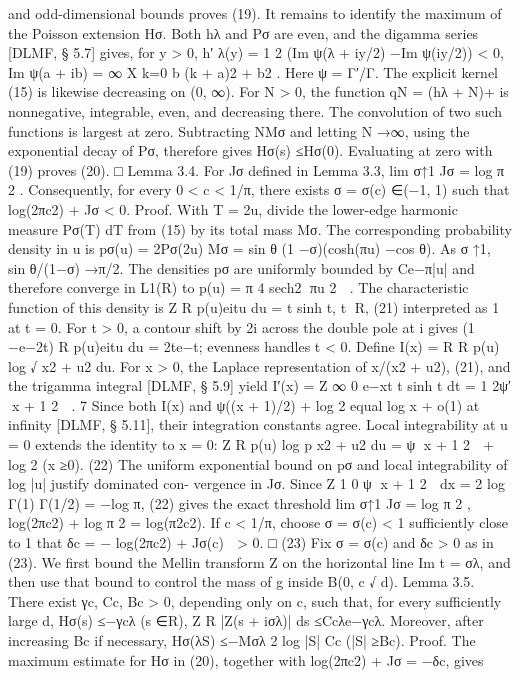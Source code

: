 and odd-dimensional bounds proves (19).
It remains to identify the maximum of the Poisson extension Hσ. Both hλ and Pσ are even,
and the digamma series [DLMF, § 5.7] gives, for y > 0,
h′
λ(y) = 1
2 (Im ψ(λ + iy/2) −Im ψ(iy/2)) < 0,
Im ψ(a + ib) =
∞
X
k=0
b
(k + a)2 + b2 .
Here ψ = Γ′/Γ. The explicit kernel (15) is likewise decreasing on (0, ∞). For N > 0, the function
qN = (hλ + N)+ is nonnegative, integrable, even, and decreasing there. The convolution of two
such functions is largest at zero. Subtracting NMσ and letting N →∞, using the exponential
decay of Pσ, therefore gives Hσ(s) ≤Hσ(0). Evaluating at zero with (19) proves (20).
□
Lemma 3.4. For Jσ deﬁned in Lemma 3.3,
lim
σ↑1 Jσ = log π
2 .
Consequently, for every 0 < c < 1/π, there exists σ = σ(c) ∈(−1, 1) such that log(2πc2) + Jσ <
0.
Proof. With T = 2u, divide the lower-edge harmonic measure Pσ(T) dT from (15) by its total
mass Mσ. The corresponding probability density in u is
pσ(u) = 2Pσ(2u)
Mσ
=
sin θ
(1 −σ)(cosh(πu) −cos θ).
As σ ↑1, sin θ/(1−σ) →π/2. The densities pσ are uniformly bounded by Ce−π|u| and therefore
converge in L1(R) to
p(u) = π
4 sech2
πu
2

.
The characteristic function of this density is
Z
R
p(u)eitu du =
t
sinh t,
t ∈R,
(21)
interpreted as 1 at t = 0. For t > 0, a contour shift by 2i across the double pole at i gives
(1 −e−2t)
R p(u)eitu du = 2te−t; evenness handles t < 0. Deﬁne I(x) =
R
R p(u) log
√
x2 + u2 du.
For x > 0, the Laplace representation of x/(x2 + u2), (21), and the trigamma integral [DLMF,
§ 5.9] yield
I′(x) =
Z ∞
0
e−xt
t
sinh t dt = 1
2ψ′
x + 1
2

.
7
Since both I(x) and ψ((x + 1)/2) + log 2 equal log x + o(1) at inﬁnity [DLMF, § 5.11], their
integration constants agree. Local integrability at u = 0 extends the identity to x = 0:
Z
R
p(u) log
p
x2 + u2 du = ψ
x + 1
2

+ log 2
(x ≥0).
(22)
The uniform exponential bound on pσ and local integrability of log |u| justify dominated con-
vergence in Jσ. Since
Z 1
0
ψ
x + 1
2

dx = 2 log Γ(1)
Γ(1/2) = −log π,
(22) gives the exact threshold
lim
σ↑1 Jσ = log π
2 ,
log(2πc2) + log π
2 = log(π2c2).
If c < 1/π, choose σ = σ(c) < 1 suﬃciently close to 1 that
δc = −
 log(2πc2) + Jσ(c)
 > 0.
□
(23)
Fix σ = σ(c) and δc > 0 as in (23). We ﬁrst bound the Mellin transform Z on the horizontal
line Im t = σλ, and then use that bound to control the mass of g inside B(0, c
√
d).
Lemma 3.5. There exist γc, Cc, Bc > 0, depending only on c, such that, for every suﬃciently
large d,
Hσ(s) ≤−γcλ
(s ∈R),
Z
R
|Z(s + iσλ)| ds ≤Ccλe−γcλ.
Moreover, after increasing Bc if necessary,
Hσ(λS) ≤−Mσλ
2
log |S|
Cc
(|S| ≥Bc).
Proof. The maximum estimate for Hσ in (20), together with log(2πc2) + Jσ = −δc, gives
